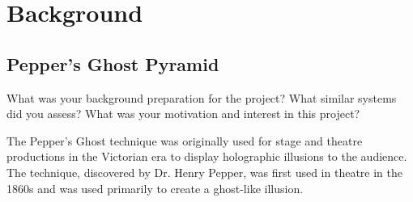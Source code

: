 \section{Background}
\subsection{Pepper's Ghost Pyramid}
What was your background preparation for the project? What similar systems did you assess? What was your motivation and interest in this project?

The Pepper's Ghost technique was originally used for stage and theatre productions in the Victorian era to display holographic illusions to the audience. The technique, discovered by Dr. Henry Pepper, was first used in theatre in the 1860s\cite{pepper_ghost_comsol} and was used primarily to create a ghost-like illusion.

\begin{figure}[h!]
\end{figure}

